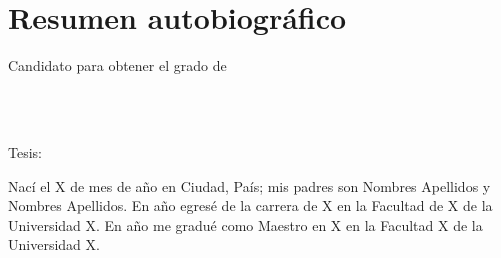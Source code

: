 
\chapter*{Resumen autobiográfico}
\thispagestyle{empty}

\begin{center}
\autor

Candidato para obtener el grado de\\
\grado\\
\orientacion\bigskip

\uanl\\
\fime\bigskip

Tesis:\\
\textsc{\large\titulo}
\end{center}\bigskip

Nací el X de mes de año en Ciudad, País; mis padres son Nombres Apellidos y Nombres Apellidos. En año egresé de la carrera de X en la Facultad de X de la Universidad X. En año me gradué como Maestro en X en la Facultad X de la Universidad X.